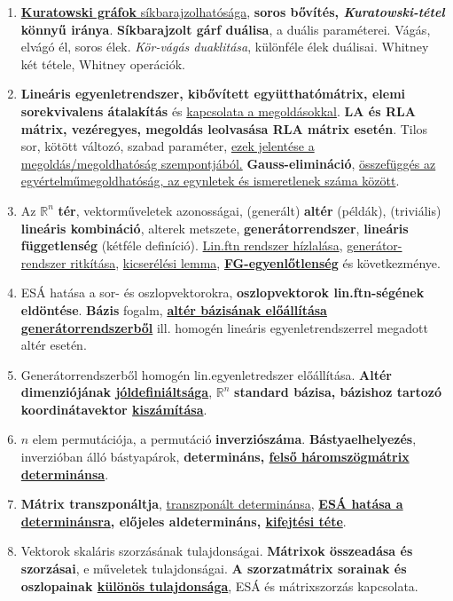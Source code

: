 \documentclass[10pt]{article}
\begin{document}
\begin{enumerate}
            \item \underline{\textbf{Kuratowski gráfok} síkbarajzolhatósága}, \textbf{soros bővítés, \textit{Kuratowski-tétel} könnyű iránya}. \textbf{Síkbarajzolt gárf duálisa}, a duális paraméterei. Vágás, elvágó él, soros élek. \textit{Kör-vágás duaklitása}, különféle élek duálisai. Whitney két tétele, Whitney operációk.
            \item \textbf{Lineáris egyenletrendszer, kibővített együtthatómátrix, elemi sorekvivalens átalakítás} és \underline{kapcsolata a megoldásokkal}. \textbf{LA és RLA mátrix, vezéregyes, megoldás leolvasása RLA mátrix esetén}. Tilos sor, kötött változó, szabad paraméter, \underline{ezek jelentése a megoldás/megoldhatóság szempontjából.} \textbf{Gauss-elimináció}, \underline{összefüggés az egyértelműmegoldhatóság, az egynletek és ismeretlenek száma között}.
            \item Az $\mathbb{R}^n$ \textbf{tér}, vektorműveletek azonosságai, (generált) \textbf{altér} (példák), (triviális) \textbf{lineáris kombináció}, alterek metszete, \textbf{generátorrendszer}, \textbf{lineáris függetlenség} (kétféle definíció). \underline{Lin.ftn rendszer hízlalása}, \underline{generátor-rendszer ritkítása}, \underline{kicserélési lemma}, \underline{\textbf{FG-egyenlőtlenség}} és következménye.
            \item ESÁ hatása a sor- és oszlopvektorokra, \textbf{oszlopvektorok lin.ftn-ségének eldöntése}. \textbf{Bázis} fogalm, \underline{\textbf{altér bázisának előállítása generátorrendszerből}} ill. homogén lineáris egyenletrendszerrel megadott altér esetén.
            \item Generátorrendszerből homogén lin.egyenletredszer előállítása. \textbf{Altér dimenziójának \underline{jóldefiniáltsága}}, $\mathbb{R}^n$ \textbf{standard bázisa, bázishoz tartozó koordinátavektor \underline{kiszámítása}}.
            \item $n$ elem permutációja, a permutáció \textbf{inverziószáma}. \textbf{Bástyaelhelyezés}, inverzióban álló bástyapárok, \textbf{determináns, \underline{felső háromszögmátrix determinánsa}}.
            \item \textbf{Mátrix transzponáltja}, \underline{transzponált determinánsa}, \textbf{\underline{ESÁ hatása a determinánsra}, előjeles aldetermináns, \underline{kifejtési téte}}.
            \item Vektorok skaláris szorzásának tulajdonságai. \textbf{Mátrixok összeadása és szorzásai}, e műveletek tulajdonságai. \textbf{A szorzatmátrix sorainak és oszlopainak \underline{különös tulajdonsága}}, ESÁ és mátrixszorzás kapcsolata.

\end{enumerate}
\end{document}
